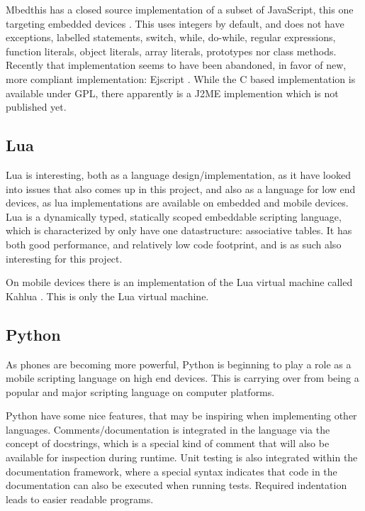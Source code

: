 \documentclass[11pt]{report}
\begin{document}
Mbedthis has a closed source implementation of a subset of JavaScript, this one targeting embedded devices \cite{mbedthis}. This uses integers by default, and does not have exceptions, labelled statements, switch, while, do-while, regular expressions, function literals, object literals, array literals, prototypes nor class methods.
Recently that implementation seems to have been abandoned, in favor of new, more compliant implementation: Ejscript \cite{ejscript}.
While the C based implementation is available under GPL, there apparently is a J2ME implemention which is not published yet.

\subsection{Lua}

Lua is interesting, both as a language design/implementation, as it have looked into issues that also comes up in this project, and also as a language for low end devices, as lua implementations are available on embedded and mobile devices.
Lua is a dynamically typed, statically scoped embeddable scripting language, which is characterized by only have one datastructure: associative tables.
It has both good performance, and relatively low code footprint, and is as such also interesting for this project.

On mobile devices there is an implementation of the Lua virtual machine called Kahlua \cite{kahlua}.
This is only the Lua virtual machine.

\subsection{Python}
As phones are becoming more powerful, Python is beginning to play a role as a mobile scripting language on high end devices. This is carrying over from being a popular and major scripting language on computer platforms.

Python have some nice features, that may be inspiring when implementing other languages. Comments/documentation is integrated in the language via the concept of docstrings, which is a special kind of comment that will also be available for inspection during runtime. Unit testing is also integrated within the documentation framework, where a special syntax indicates that code in the documentation can also be executed when running tests.
Required indentation leads to easier readable programs.
\end{document}
